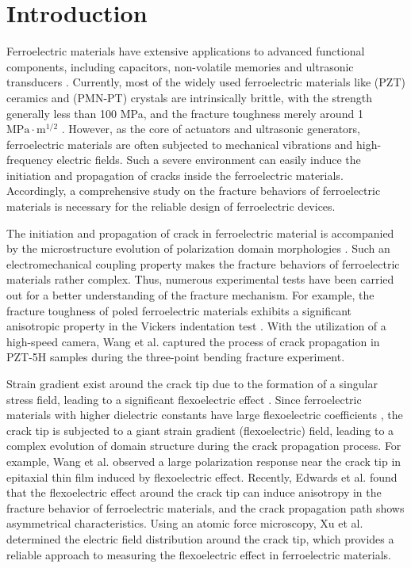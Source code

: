 \section{Introduction}

Ferroelectric materials have extensive applications to advanced functional components, including capacitors,  non-volatile memories and ultrasonic transducers \cite{martin_thin-film_2017}. Currently, most of the widely used ferroelectric materials like  (PZT) ceramics and  (PMN-PT) crystals are intrinsically brittle, with the strength generally less than 100 MPa, and the fracture toughness merely around {1 $\mathrm{MPa}\cdot\mathrm{m}^{1/2}$} \cite{schneider_influence_2007}. However, as the core of actuators and ultrasonic generators,  ferroelectric materials are often subjected to mechanical vibrations and high-frequency electric fields. Such a severe environment can easily induce the initiation and propagation of cracks inside the ferroelectric materials. Accordingly, a comprehensive study on the fracture behaviors of ferroelectric materials is necessary for the reliable design of ferroelectric devices. 

The initiation and propagation of crack in ferroelectric material is accompanied by the microstructure evolution of polarization domain morphologies \cite{yingwei_influence_2020}. Such an electromechanical coupling property makes the fracture behaviors of ferroelectric materials rather complex. Thus, numerous experimental tests have been carried out for a better understanding of the fracture mechanism. For example, the fracture toughness of poled ferroelectric materials exhibits a significant anisotropic property in the Vickers indentation test \cite{yamamoto_internal_1983,okazaki_electro-mechanical_1992,lynch_crack_1995}. With the utilization of a high-speed camera, Wang et al. \cite{wang_influence_2020} captured the process of crack propagation in PZT-5H samples during the three-point bending fracture experiment. 

Strain gradient exist around the crack tip due to the formation of a singular stress field, leading to a significant flexoelectric effect \cite{zubko_flexoelectric_2013,yudin_fundamentals_2013}. Since ferroelectric materials with higher dielectric constants have large flexoelectric coefficients \cite{ma_flexoelectricity_2006,hong_first-principles_2013}, the crack tip is subjected to a giant strain gradient (flexoelectric) field, leading to a complex evolution of domain structure during the crack propagation process. For example, Wang et al. \cite{wang_direct_2020} observed a large polarization response near the crack tip in  epitaxial thin film induced by flexoelectric effect. Recently, Edwards et al. \cite{cordero-edwards_flexoelectric_2019} found that the flexoelectric effect around the crack tip can induce anisotropy in the fracture behavior of ferroelectric materials, and the crack propagation path shows asymmetrical characteristics.  Using an atomic force microscopy, Xu et al. \cite{xu_directly_2023} determined the electric field distribution around the crack tip, which provides a reliable approach to measuring the flexoelectric effect in ferroelectric materials. 

